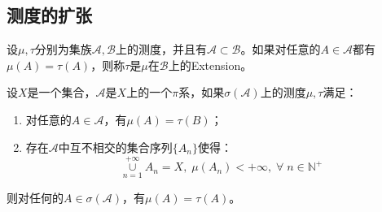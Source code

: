 \subsection{测度的扩张}
\begin{definition}
	设$\mu,\tau$分别为集族$\mathscr{A},\mathscr{B}$上的测度，并且有$\mathscr{A}\subset\mathscr{B}$。如果对任意的$A\in \mathscr{A}$都有$\mu(A)=\tau(A)$，则称$\tau$是$\mu$在$\mathscr{B}$上的\gls{Extension}。
\end{definition}
\begin{lemma}
	设$X$是一个集合，$\mathscr{A}$是$X$上的一个$\pi$系，如果$\sigma(\mathscr{A})$上的测度$\mu,\tau$满足：
	\begin{enumerate}
		\item 对任意的$A\in \mathscr{A}$，有$\mu(A)=\tau(B)$；
		\item 存在$\mathscr{A}$中互不相交的集合序列$\{A_n\}$使得：
		\begin{equation*}
			\underset{n=1}{\overset{+\infty}{\cup}}A_n=X,\;\mu(A_n)<+\infty,\;\forall\;n\in\mathbb{N}^+
		\end{equation*}
	\end{enumerate}
	则对任何的$A\in\sigma(\mathscr{A})$，有$\mu(A)=\tau(A)$。
\end{lemma}
